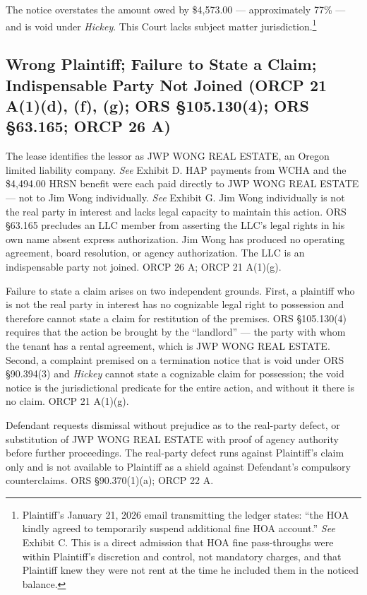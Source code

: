 \documentclass[12pt,letterpaper]{article}
\begin{document}
The notice overstates the amount owed by \$4,573.00 --- approximately 77\% --- and is void under \textit{Hickey}. This Court lacks subject matter jurisdiction.\footnote{Plaintiff's January 21, 2026 email transmitting the ledger states: ``the HOA kindly agreed to temporarily suspend additional fine HOA account.'' \textit{See} Exhibit C. This is a direct admission that HOA fine pass-throughs were within Plaintiff's discretion and control, not mandatory charges, and that Plaintiff knew they were not rent at the time he included them in the noticed balance.}

\subsection{Wrong Plaintiff; Failure to State a Claim; Indispensable Party Not Joined (ORCP 21 A(1)(d), (f), (g); ORS \S105.130(4); ORS \S63.165; ORCP 26 A)}

The lease identifies the lessor as JWP WONG REAL ESTATE, an Oregon limited liability company. \textit{See} Exhibit D. HAP payments from WCHA and the \$4,494.00 HRSN benefit were each paid directly to JWP WONG REAL ESTATE --- not to Jim Wong individually. \textit{See} Exhibit G. Jim Wong individually is not the real party in interest and lacks legal capacity to maintain this action. ORS \S63.165 precludes an LLC member from asserting the LLC's legal rights in his own name absent express authorization. Jim Wong has produced no operating agreement, board resolution, or agency authorization. The LLC is an indispensable party not joined. ORCP 26 A; ORCP 21 A(1)(g).

Failure to state a claim arises on two independent grounds. First, a plaintiff who is not the real party in interest has no cognizable legal right to possession and therefore cannot state a claim for restitution of the premises. ORS \S105.130(4) requires that the action be brought by the ``landlord'' --- the party with whom the tenant has a rental agreement, which is JWP WONG REAL ESTATE. Second, a complaint premised on a termination notice that is void under ORS \S90.394(3) and \textit{Hickey} cannot state a cognizable claim for possession; the void notice is the jurisdictional predicate for the entire action, and without it there is no claim. ORCP 21 A(1)(g).

Defendant requests dismissal without prejudice as to the real-party defect, or substitution of JWP WONG REAL ESTATE with proof of agency authority before further proceedings. The real-party defect runs against Plaintiff's claim only and is not available to Plaintiff as a shield against Defendant's compulsory counterclaims. ORS \S90.370(1)(a); ORCP 22 A.
\end{document}
